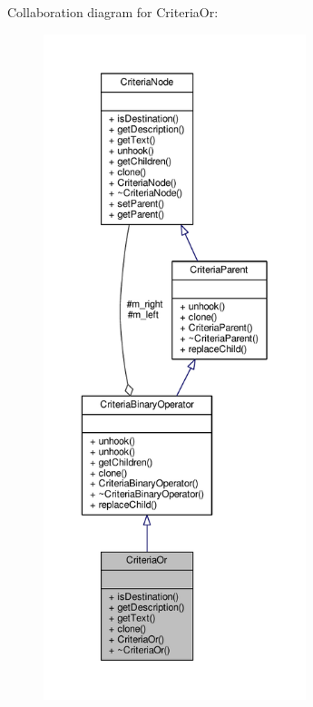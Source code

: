 Collaboration diagram for Criteria\+Or\+:
\nopagebreak
\begin{figure}[H]
\begin{center}
\leavevmode
\includegraphics[height=550pt]{db/df0/classCriteriaOr__coll__graph}
\end{center}
\end{figure}
